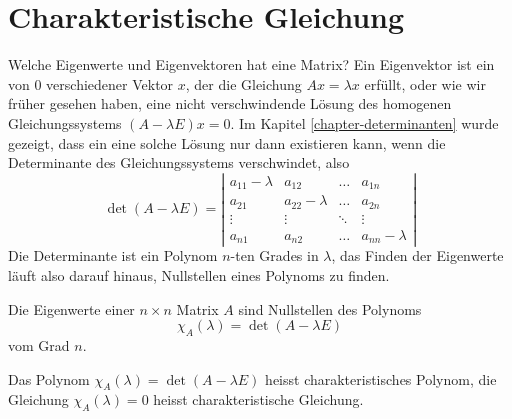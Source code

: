 \section{Charakteristische Gleichung}
Welche Eigenwerte und Eigenvektoren hat eine Matrix? Ein Eigenvektor 
ist ein von $0$ verschiedener Vektor $x$, der die Gleichung
$Ax=\lambda x$ erfüllt, oder wie wir früher gesehen haben,
eine nicht verschwindende Lösung des homogenen Gleichungssystems
$(A-\lambda E)x=0$.
Im Kapitel \ref{chapter-determinanten} wurde gezeigt, dass ein eine solche
Lösung nur dann existieren kann, wenn die Determinante des Gleichungssystems
verschwindet, also
\[
\det(A-\lambda E)=
\left|
\begin{matrix}
a_{11}-\lambda&a_{12}&\dots&a_{1n}\\
a_{21}&a_{22}-\lambda&\dots&a_{2n}\\
\vdots&\vdots&\ddots&\vdots\\
a_{n1}&a_{n2}&\dots&a_{nn}-\lambda
\end{matrix}
\right|
\]
Die Determinante ist ein Polynom $n$-ten Grades in $\lambda$, das Finden der
Eigenwerte läuft also darauf hinaus, Nullstellen eines Polynoms zu finden.
\begin{satz}
Die Eigenwerte einer $n\times n$ Matrix $A$ sind Nullstellen des
Polynoms
\[
\chi_A(\lambda)=\det(A-\lambda E)
\]
vom Grad $n$.
\end{satz}
\begin{definition}
Das Polynom $\chi_A(\lambda)=\det(A-\lambda E)$ heisst
charakteristisches Polynom,
die Gleichung $\chi_A(\lambda)=0$ heisst 
charakteristische Gleichung.
\end{definition}


